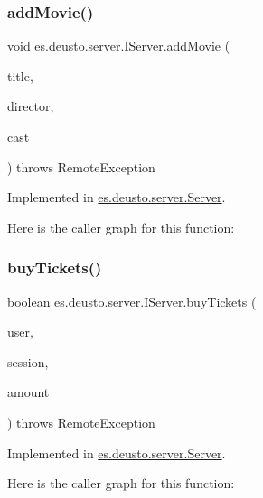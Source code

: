 \subsubsection{\texorpdfstring{addMovie()}{addMovie()}}
{\footnotesize\ttfamily void es.\+deusto.\+server.\+I\+Server.\+add\+Movie (\begin{DoxyParamCaption}\item[{String}]{title,  }\item[{String}]{director,  }\item[{List$<$ String $>$}]{cast }\end{DoxyParamCaption}) throws Remote\+Exception}



Implemented in \mbox{\hyperlink{classes_1_1deusto_1_1server_1_1_server_a150317903dc393d29f39db81e79131e0}{es.\+deusto.\+server.\+Server}}.

Here is the caller graph for this function\+:
\mbox{\label{interfacees_1_1deusto_1_1server_1_1_i_server_ac3302c01fefc37a32c0bcbf79fcce44b}} 
\subsubsection{\texorpdfstring{buyTickets()}{buyTickets()}}
{\footnotesize\ttfamily boolean es.\+deusto.\+server.\+I\+Server.\+buy\+Tickets (\begin{DoxyParamCaption}\item[{\mbox{\hyperlink{classes_1_1deusto_1_1server_1_1data_1_1_user_d_t_o}{User\+D\+TO}}}]{user,  }\item[{\mbox{\hyperlink{classes_1_1deusto_1_1server_1_1data_1_1_session_d_t_o}{Session\+D\+TO}}}]{session,  }\item[{int}]{amount }\end{DoxyParamCaption}) throws Remote\+Exception}



Implemented in \mbox{\hyperlink{classes_1_1deusto_1_1server_1_1_server_a3bbf9f19774d2fae5c831cfac1f2306c}{es.\+deusto.\+server.\+Server}}.

Here is the caller graph for this function\+:
\mbox{\label{interfacees_1_1deusto_1_1server_1_1_i_server_a0b3243dc04d49f7659fefec4e4fb43b7}} 
